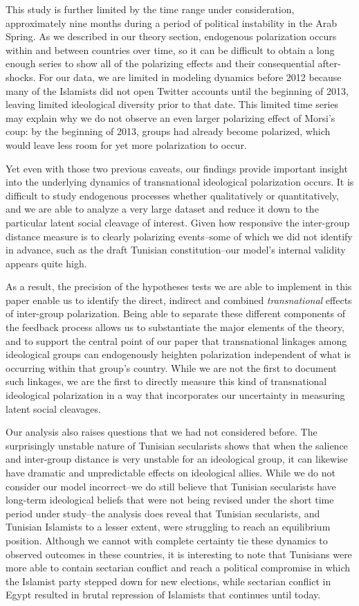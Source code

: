 \documentclass[12pt]{article}
\begin{document}
This study is further limited by the time range under consideration, approximately nine months during a period of political instability in the Arab Spring. As we described in our theory section, endogenous polarization occurs within and between countries over time, so it can be difficult to obtain a long enough series to show all of the polarizing effects and their consequential after-shocks. For our data, we are limited in modeling dynamics before 2012 because many of the Islamists did not open Twitter accounts until the beginning of 2013, leaving limited ideological diversity prior to that date. This limited time series may explain why we do not observe an even larger polarizing effect of Morsi's coup: by the beginning of 2013, groups had already become polarized, which would leave less room for yet more polarization to occur.

Yet even with those two previous caveats, our findings provide important insight into the underlying dynamics of transnational ideological polarization occurs. It is difficult to study endogenous processes whether qualitatively or quantitatively, and we are able to analyze a very large dataset and reduce it down to the particular latent social cleavage of interest. Given how responsive the inter-group distance measure is to clearly polarizing events--some of which we did not identify in advance, such as the draft Tunisian constitution--our model's internal validity appears quite high.

As a result, the precision of the hypotheses tests we are able to implement in this paper enable us to identify the direct, indirect and combined \emph{transnational} effects of inter-group polarization. Being able to separate these different components of the feedback process allows us to substantiate the major elements of the theory, and to support the central point of our paper that transnational linkages among ideological groups can endogenously heighten polarization independent of what is occurring within that group's country. While we are not the first to document such linkages, we are the first to directly measure this kind of transnational ideological polarization in a way that incorporates our uncertainty in measuring latent social cleavages.

Our analysis also raises questions that we had not considered before. The surprisingly unstable nature of Tunisian secularists shows that when the salience and inter-group distance is very unstable for an ideological group, it can likewise have dramatic and unpredictable effects on ideological allies. While we do not consider our model incorrect--we do still believe that Tunisian secularists have long-term ideological beliefs that were not being revised under the short time period under study--the analysis does reveal that Tunisian secularists, and Tunisian Islamists to a lesser extent, were struggling to reach an equilibrium position. Although we cannot with complete certainty tie these dynamics to observed outcomes in these countries, it is interesting to note that Tunisians were more able to contain sectarian conflict and reach a political compromise in which the Islamist party stepped down for new elections, while sectarian conflict in Egypt resulted in brutal repression of Islamists that continues until today.
\end{document}
